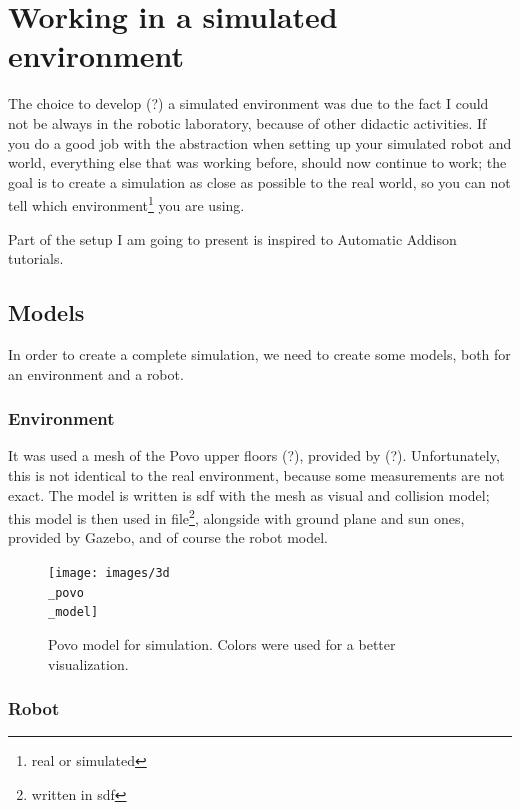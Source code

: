\chapter{Working in a simulated environment}

The choice to develop (?) a simulated environment was due to the fact I could not be always in the robotic laboratory, because of other didactic activities. If you do a good job with the abstraction when setting up your simulated robot and world, everything else that was working before, should now continue to work; the goal is to create a simulation as close as possible to the real world, so you can not tell which environment\footnote{real or simulated} you are using.

Part of the setup I am going to present is inspired to Automatic Addison tutorials\cite{tutorials}.

\section{Models}

In order to create a complete simulation, we need to create some models, both for an environment and a robot.

\subsection*{Environment}

It was used a mesh of the Povo upper floors (?), provided by (?). Unfortunately, this is not identical to the real environment, because some measurements are not exact.
The model is written is \Acrfull{sdf} with the mesh as visual and collision model; this model is then used in  file\footnote{written in \Acrshort{sdf}}, alongside with ground plane and sun ones, provided by Gazebo, and of course the robot model.

\begin{figure}[h]
    \centering
    \texttt{[image: images/3d\\\_povo\\\_model]}
    \caption{Povo model for simulation. Colors were used for a better visualization.}
\end{figure}

\newpage

\subsection*{Robot}

